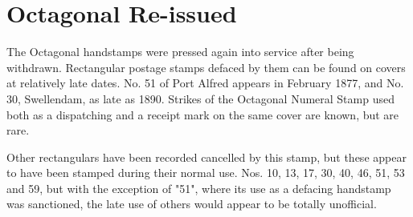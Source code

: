 \section{Octagonal Re-issued}

The Octagonal handstamps were pressed again into service after being withdrawn. Rectangular postage stamps defaced by them can be found on covers at relatively late dates. No. 51 of Port Alfred appears in February 1877, and No. 30, Swellendam, as late as 1890. Strikes of the Octagonal Numeral Stamp used both as a dispatching and a receipt mark on the same cover are known, but are rare.



Other rectangulars have been recorded cancelled by this stamp, but these appear to have been stamped during their normal use. Nos. 10, 13, 17, 30, 40, 46, 51, 53 and 59, but with the exception of "51", where its use as a defacing handstamp was sanctioned, the late use of others would appear to be totally unofficial.

                